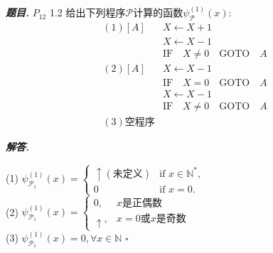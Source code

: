 \documentclass[10pt, a4paper, oneside]{ctexart}
\newenvironment{problem}{\begin{framed}\par\noindent\textbf{\textit{题目. }}}{\end{framed}\par}
\newenvironment{solution}{%
  \par\noindent\textbf{\textit{解答. }}\ignorespaces
}{%
  \hfill\ensuremath{\square}\par
}
\begin{document}
\begin{problem}
$P_{12}$ 1.2 给出下列程序$\mathscr{P}$计算的函数$\psi_{\mathscr{P}}^{(1)}(x)$:
\begin{align*}
    (1) [A]&X\leftarrow X+1\\
    &X\leftarrow X-1\\
    &\text{IF}\quad X\neq 0 \quad \text{GOTO}\quad  A\\
    (2) [A]&X\leftarrow X-1\\
    &\text{IF}\quad X=0 \quad \text{GOTO}\quad  A\\
    &X\leftarrow X-1\\
    &\text{IF}\quad X\neq 0 \quad \text{GOTO}\quad  A\\
    (3) \text{空程序}&
\end{align*}
\end{problem}
\begin{solution}
(1) $\psi_{\mathscr{P}_1}^{(1)}(x) =
\begin{cases}
    \uparrow (\text{未定义})  & \text{if } x \in \mathbb{N}^*, \\
  0 & \text{if } x = 0.
\end{cases}$\\
(2) $\psi_{\mathscr{P}_1}^{(1)}(x) =\begin{cases}0,&x\text{是正偶数}\\ \uparrow , &x=0 \text{或}x\text{是奇数}\end{cases} $\\
(3) $\psi_{\mathscr{P}_1}^{(1)}(x)=0, \forall x\in \mathbb{N}$
\end{solution}
\end{document}
